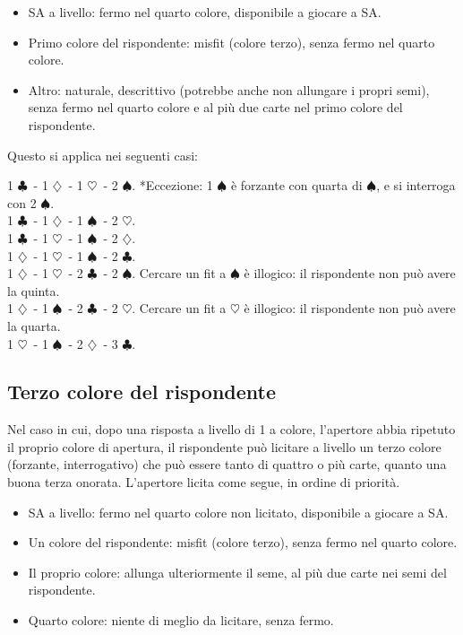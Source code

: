 \documentclass[a4paper,10pt]{article}
\renewcommand{\c}{$\clubsuit$\xspace}
\renewcommand{\d}{$\diamondsuit$\xspace}
\newcommand{\h}{$\heartsuit$\xspace}
\newcommand{\s}{$\spadesuit$\xspace}
\newcommand{\sa}{SA\xspace}
\begin{document}
\begin{itemize}
 \item \sa a livello: fermo nel quarto colore, disponibile a giocare a \sa.
 \item Primo colore del rispondente: misfit (colore terzo), senza fermo nel quarto colore.
 \item Altro: naturale, descrittivo (potrebbe anche non allungare i propri semi), senza fermo nel quarto colore e al più due carte nel primo colore del rispondente.
\end{itemize}

Questo si applica nei seguenti casi:

1 \c\ - 1 \d\ - 1 \h\ - 2 \s. *Eccezione: 1 \s è forzante con quarta di \s, e si interroga con 2 \s.\\
1 \c\ - 1 \d\ - 1 \s\ - 2 \h.\\
1 \c\ - 1 \h\ - 1 \s\ - 2 \d.\\
1 \d\ - 1 \h\ - 1 \s\ - 2 \c.\\
1 \d\ - 1 \h\ - 2 \c\ - 2 \s. Cercare un fit a \s è illogico: il rispondente non può avere la quinta.\\
1 \d\ - 1 \s\ - 2 \c\ - 2 \h. Cercare un fit a \h è illogico: il rispondente non può avere la quarta.\\
1 \h\ - 1 \s\ - 2 \d\ - 3 \c.

\subsection{Terzo colore del rispondente}

Nel caso in cui, dopo una risposta a livello di 1 a colore, l'apertore abbia ripetuto il proprio colore di apertura, il rispondente può licitare a livello un terzo colore (forzante, interrogativo) che può essere tanto di quattro o più carte, quanto una buona terza onorata. L'apertore licita come segue, in ordine di priorità.

\begin{itemize}
 \item \sa a livello: fermo nel quarto colore non licitato, disponibile a giocare a \sa.
 \item Un colore del rispondente: misfit (colore terzo), senza fermo nel quarto colore.
 \item Il proprio colore: allunga ulteriormente il seme, al più due carte nei semi del rispondente.
 \item Quarto colore: niente di meglio da licitare, senza fermo.
\end{itemize}
\end{document}
